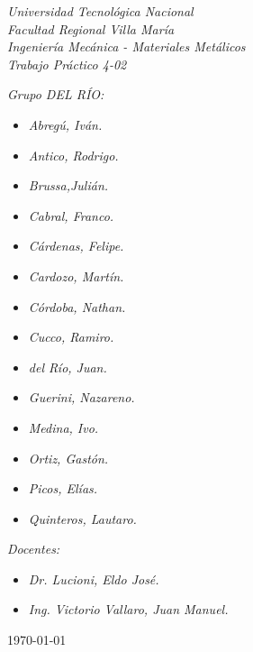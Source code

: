 \begin{titlepage}
	
	\begin{center}
		{\huge \textit{Universidad Tecnológica Nacional}}\\
        \vspace{0.5cm}
		{\LARGE \textit{Facultad Regional Villa María}}\\
		\vspace{1.5cm}
        {\LARGE{\textit{Ingeniería Mecánica - Materiales Metálicos}}}\\
		\vspace{1.5cm}
        \LARGE{\textit{Trabajo Práctico 4-02}}
	\end{center}
	
	\vfill

    \textit{Grupo DEL RÍO:}
	\begin{itemize}
		\item \textit{Abregú, Iván.}
		\item \textit{Antico, Rodrigo.}
		\item \textit{Brussa,Julián.}
		\item \textit{Cabral, Franco.}
        \item \textit{Cárdenas, Felipe.}
        \item \textit{Cardozo, Martín.}
        \item \textit{Córdoba, Nathan.}
        \item \textit{Cucco, Ramiro.}
        \item \textit{del Río, Juan.}
        \item \textit{Guerini, Nazareno.}
        \item \textit{Medina, Ivo.}
        \item \textit{Ortiz, Gastón.}
        \item \textit{Picos, Elías.}
        \item \textit{Quinteros, Lautaro.}
	\end{itemize}
    
	\textit{Docentes:}
	\begin{itemize}
		\item \textit{Dr. Lucioni, Eldo José.}
		\item \textit{Ing. Victorio Vallaro, Juan Manuel.}
	\end{itemize}
	\centering
	\today
	
\end{titlepage}
